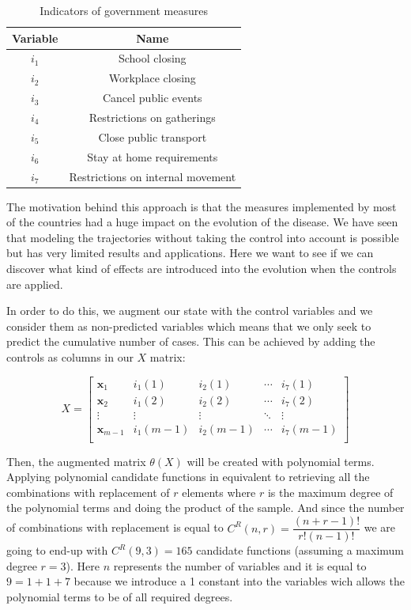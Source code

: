 \documentclass[12pt, letterpaper]{article}
\begin{document}
\begin{table}[h!]
\centering
\begin{tabular}{ |c|c| } 
 \hline
 Variable & Name \\ 
 \hline
$i_1$ & School closing \\
$i_2$ & Workplace closing \\
$i_3$ & Cancel public events \\
$i_4$ & Restrictions on gatherings \\
$i_5$ & Close public transport \\ 
$i_6$ & Stay at home requirements \\ 
$i_7$ & Restrictions on internal movement \\

 \hline
\end{tabular}
\caption{Indicators of government measures}
\label{tab:stringency}
\end{table}

The motivation behind this approach is that the measures implemented by most of the countries had a huge impact on the evolution of the disease. 
We have seen that modeling the trajectories without taking the control into account is possible but has very limited results and applications.
Here we want to see if we can discover what kind of effects are introduced into the evolution when the controls are applied.

In order to do this, we augment our state with the control variables and we consider them as non-predicted variables which means that we only seek to predict the cumulative number of cases. 
This can be achieved by adding the controls as columns in our $X$ matrix:

$$X =
\begin{bmatrix}
\mathbf{x}_1 & i_1(1) & i_2(1) & \cdots & i_7(1) \\
\mathbf{x}_2 & i_1(2) & i_2(2) & \cdots & i_7(2) \\
\vdots & \vdots & \vdots & \ddots & \vdots \\
\mathbf{x}_{m-1} & i_1(m-1) & i_2(m-1) & \cdots & i_7(m-1) \\
\end{bmatrix}
$$

Then, the augmented matrix $\theta(X)$ will be created with polynomial terms.
Applying polynomial candidate functions in equivalent to retrieving all the combinations with replacement of $r$ elements where $r$ is the maximum degree of the polynomial terms and doing the product of the sample. 
And since the number of combinations with replacement is equal to $C^R(n,r) = \dfrac{(n + r - 1)!}{ r! (n - 1)! }$ we are going to end-up with $C^R(9, 3) = 165$ candidate functions (assuming a maximum degree $r=3$). 
Here $n$ represents the number of variables and it is equal to $9=1+1+7$ because we introduce a 1 constant into the variables wich allows the polynomial terms to be of all required degrees. 
\end{document}
